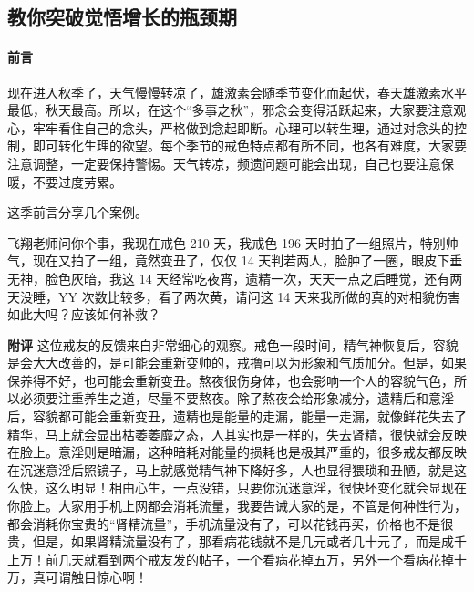 \subsection{教你突破觉悟增长的瓶颈期}

\paragraph*{前言}

现在进入秋季了，天气慢慢转凉了，雄激素会随季节变化而起伏，春天雄激素水平最低，秋天最高。所以，在这个“多事之秋”，邪念会变得活跃起来，大家要注意观心，牢牢看住自己的念头，严格做到念起即断。心理可以转生理，通过对念头的控制，即可转化生理的欲望。每个季节的戒色特点都有所不同，也各有难度，大家要注意调整，一定要保持警惕。天气转凉，频遗问题可能会出现，自己也要注意保暖，不要过度劳累。

这季前言分享几个案例。

\begin{case}
    飞翔老师问你个事，我现在戒色 210 天，我戒色 196 天时拍了一组照片，特别帅气，现在又拍了一组，竟然变丑了，仅仅 14 天判若两人，脸肿了一圈，眼皮下垂无神，脸色灰暗，我这 14 天经常吃夜宵，遗精一次，天天一点之后睡觉，还有两天没睡，YY 次数比较多，看了两次黄，请问这 14 天来我所做的真的对相貌伤害如此大吗？应该如何补救？

    \textbf{附评} 这位戒友的反馈来自非常细心的观察。戒色一段时间，精气神恢复后，容貌是会大大改善的，是可能会重新变帅的，戒撸可以为形象和气质加分。但是，如果保养得不好，也可能会重新变丑。熬夜很伤身体，也会影响一个人的容貌气色，所以必须要注重养生之道，尽量不要熬夜。除了熬夜会给形象减分，遗精后和意淫后，容貌都可能会重新变丑，遗精也是能量的走漏，能量一走漏，就像鲜花失去了精华，马上就会显出枯萎萎靡之态，人其实也是一样的，失去肾精，很快就会反映在脸上。意淫则是暗漏，这种暗耗对能量的损耗也是极其严重的，很多戒友都反映在沉迷意淫后照镜子，马上就感觉精气神下降好多，人也显得猥琐和丑陋，就是这么快，这么明显！相由心生，一点没错，只要你沉迷意淫，很快坏变化就会显现在你脸上。大家用手机上网都会消耗流量，我要告诫大家的是，不管是何种性行为，都会消耗你宝贵的“肾精流量”，手机流量没有了，可以花钱再买，价格也不是很贵，但是，如果肾精流量没有了，那看病花钱就不是几元或者几十元了，而是成千上万！前几天就看到两个戒友发的帖子，一个看病花掉五万，另外一个看病花掉十万，真可谓触目惊心啊！
\end{case}

